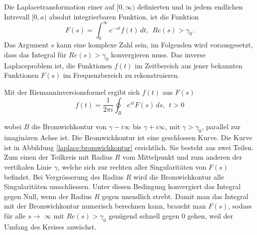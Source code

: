 %
%
%
Die Laplacetransformation einer auf $[0, \infty)$ definierten und in jedem endlichen Intrevall $[0, a)$ absolut integrierbaren Funktion, ist die Funktion
\begin{equation}
F(s) = \int_0^\infty e^{-st}f(t)\,dt,~~Re(s)>\gamma_{0}.
\label{laplace:definition}
\end{equation}
Das Argument $s$ kann eine komplexe Zahl sein, im Folgenden wird vorausgesetzt, dass das Integral für $Re(s)>\gamma_{0}$ konvergieren muss.
Das inverse Laplaceproblem ist, die Funktionen $f(t)$ im Zeitbereich aus jener bekannten Funktionen $F(s)$ im Frequenzbereich zu rekonstruieren.

Mit der Riemanninversionsformel ergibt sich $f(t)$ aus $F(s)$
\begin{equation}
f(t) = \frac{1}{2\pi i} \oint_{B} e^{st}F(s)\,ds,~~t>0
\label{laplace:riemanninversionsformel}
\end{equation}

wobei $B$ die Bromwichkontur von $\gamma-i\infty$ bis $\gamma+i\infty$, mit $\gamma>\gamma_{0}$, parallel zur imaginären Achse ist. Die Bromwichkontur ist eine geschlossen Kurve. Die Kurve ist in Abbildung \ref{laplace:bromwichkontur} ersichtlich. Sie besteht aus zwei Teilen. Zum einen der Teilkreis mit Radius $R$ vom Mittelpunkt und zum anderen der vertikalen Linie $\gamma$, welche sich zur rechten aller Singularitäten von $F(s)$ befindet.  Bei Vergrösserung des Radius $R$ wird die Bromwichkontur alle Singularitäten umschliessen. Unter diesen Bedingung konvergiert das Integral gegen Null, wenn der Radius $R$ gegen unendlich strebt.
Damit man das Integral mit der Bromwichkontur numerisch berechnen kann, braucht man $F(s)$, sodass für alle $s\rightarrow$ $\infty$ mit $Re(s)> \gamma_{0}$ genügend schnell gegen 0 gehen, weil der Umfang des Kreises anwächst.


